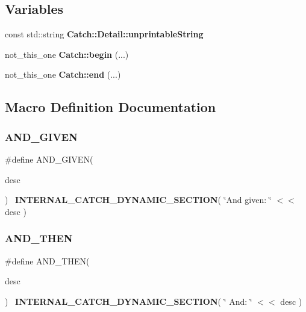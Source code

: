 \subsection*{Variables}
\begin{DoxyCompactItemize}
\item 
const std\+::string \textbf{ Catch\+::\+Detail\+::unprintable\+String}
\item 
not\+\_\+this\+\_\+one \textbf{ Catch\+::begin} (...)
\item 
not\+\_\+this\+\_\+one \textbf{ Catch\+::end} (...)
\end{DoxyCompactItemize}


\subsection{Macro Definition Documentation}
\mbox{\label{catch_8hpp_a89dcfbe509f3f81fd865d4acd1632b66}} 
\subsubsection{AND\_GIVEN}
{\footnotesize\ttfamily \#define A\+N\+D\+\_\+\+G\+I\+V\+EN(\begin{DoxyParamCaption}\item[{}]{desc }\end{DoxyParamCaption})~\textbf{ I\+N\+T\+E\+R\+N\+A\+L\+\_\+\+C\+A\+T\+C\+H\+\_\+\+D\+Y\+N\+A\+M\+I\+C\+\_\+\+S\+E\+C\+T\+I\+ON}( \char`\"{}And given\+: \char`\"{} $<$$<$ desc )}

\mbox{\label{catch_8hpp_aafdc2a6cfbcecedec25e64bcbd6c09c6}} 
\subsubsection{AND\_THEN}
{\footnotesize\ttfamily \#define A\+N\+D\+\_\+\+T\+H\+EN(\begin{DoxyParamCaption}\item[{}]{desc }\end{DoxyParamCaption})~\textbf{ I\+N\+T\+E\+R\+N\+A\+L\+\_\+\+C\+A\+T\+C\+H\+\_\+\+D\+Y\+N\+A\+M\+I\+C\+\_\+\+S\+E\+C\+T\+I\+ON}( \char`\"{}      And\+: \char`\"{} $<$$<$ desc )}

\mbox{\label{catch_8hpp_a054a37584492a5dfbdb5ee0f2fc10b7a}} 
